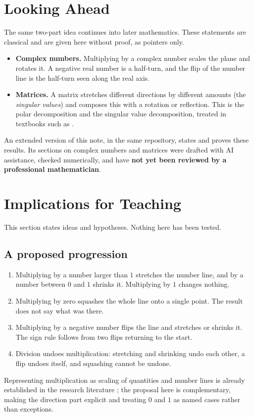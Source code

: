 \documentclass[12pt]{article}
\theoremstyle{definition}
\theoremstyle{remark}
\begin{document}
\section{Looking Ahead}\label{sec:ahead}
The same two-part idea continues into later mathematics. These statements are classical and are given here without proof, as pointers only.
\begin{itemize}
\item \textbf{Complex numbers.} Multiplying by a complex number scales the plane and rotates it. A negative real number is a half-turn, and the flip of the number line is the half-turn seen along the real axis.
\item \textbf{Matrices.} A matrix stretches different directions by different amounts (the \emph{singular values}) and composes this with a rotation or reflection. This is the polar decomposition and the singular value decomposition, treated in textbooks such as \cite{horn2013}.
\end{itemize}
An extended version of this note, in the same repository, states and proves these results. Its sections on complex numbers and matrices were drafted with AI assistance, checked numerically, and have \textbf{not yet been reviewed by a professional mathematician}.

\section{Implications for Teaching}\label{sec:teaching}
This section states ideas and hypotheses. Nothing here has been tested.

\subsection{A proposed progression}
\begin{enumerate}
\item Multiplying by a number larger than $1$ stretches the number line, and by a number between $0$ and $1$ shrinks it. Multiplying by $1$ changes nothing.
\item Multiplying by zero squashes the whole line onto a single point. The result does not say what was there.
\item Multiplying by a negative number flips the line and stretches or shrinks it. The sign rule follows from two flips returning to the start.
\item Division undoes multiplication: stretching and shrinking undo each other, a flip undoes itself, and squashing cannot be undone.
\end{enumerate}
Representing multiplication as scaling of quantities and number lines is already established in the research literature \cite{thompson2003}; the proposal here is complementary, making the direction part explicit and treating $0$ and $1$ as named cases rather than exceptions.
\end{document}
